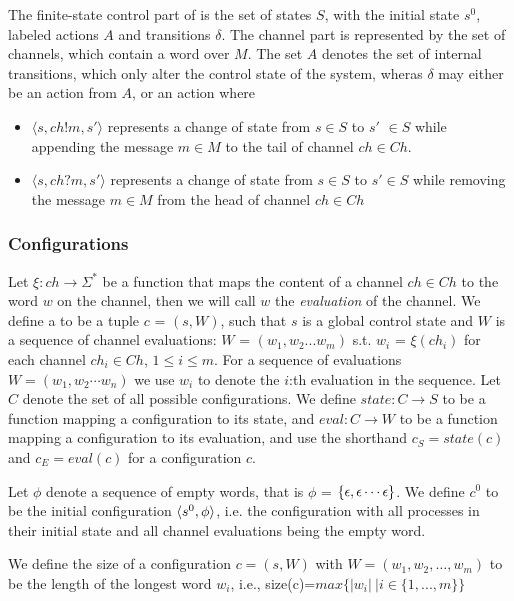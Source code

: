 The finite-state control part of  is the set of states $S$, with the initial state $s^0$, labeled actions $A$ and transitions $\delta$. The channel part is represented by the set  of channels, which contain a word over $M$. The set $A$ denotes the set of internal transitions, which only alter the control state of the system, wheras $\delta$ may either be an action from $A$, or an action where

\begin{itemize}
\item[]
$\langle s, ch!m, s'\rangle$ represents a change of state from $s \in S$ to $s'$ $\in S$ while appending the message $m\in M$ to the tail of channel $ch\in Ch$.
\item[]
$\langle s, ch?m, s'\rangle$ represents a change of state from $s\in S$ to $s'\in S$ while removing the message $m\in M$ from the head of channel $ch \in Ch$
\end{itemize}



\subsubsection{Configurations}
Let $\xi : ch \rightarrow \Sigma^*$ be a function that maps the content of a channel $ch \in Ch$ to the word $w$ on the channel, then we will call $w$ the \emph{evaluation} of the channel. We define a  to be a tuple $c$ = $(s, W)$, such that $s$ is a global control state and $W$ is a sequence of channel evaluations: $W$ = $(w_1, w_2...w_m)$ s.t. $w_i$ = $\xi(ch_i)$ for each channel $ch_i \in Ch$, $1 \leq i \leq m$.
For a sequence of evaluations $W = (w_1, w_2 \cdots w_n)$ we use $w_i$ to denote the $i$:th evaluation in the sequence.
Let $C$ denote the set of all possible configurations. We define $state : C \rightarrow S$ to be a function mapping a configuration to its state, and $eval : C \rightarrow W$ to be a function mapping a configuration to its evaluation, and use the shorthand $c_{S} = state(c)$ and $c_{E} = eval(c)$ for a configuration $c$.

Let $\phi$ denote a sequence of empty words, that is $\phi$ = $\left\{\epsilon,\epsilon\cdots\epsilon\right\}$. We define $c^0$ to be the initial configuration $\langle s^0, \phi\rangle$, i.e. the configuration with all processes in their initial state and all channel evaluations being the empty word.

We define the size of a configuration $c = (s,W)$ with $W=(w_1,w_2,\ldots,w_m)$ to be the length of the longest word $w_i$, i.e., size(c)=$max\{|w_i|~| i \in \{1, ...,m\}\}$

